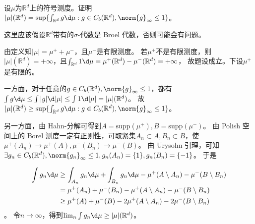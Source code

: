 \documentclass{ctexart}
\newif\ifpreface
\begin{document}
\large
\setlength{\baselineskip}{1.2em}
\ifpreface

\newgeometry{left=2cm,right=2cm,top=2cm,bottom=2cm}
\else
{}
\maketitle
\fi
\begin{problem}\label{pro:1}
  设\(\mu \)为\(\mathbb{R}^d \)上的符号测度。证明\(|\mu|(\mathbb{R}^d) = \sup \{ \int_{\mathbb{R}^d} g \d \mu: g \in C_b(\mathbb{R}^d), \norm{g}_{\infty} \leq 1\} \)。
\end{problem}
\begin{solution}
  这里应该假设\(\mathbb{R}^d \)带有的\(\sigma \)-代数是 Broel 代数，否则可能会有问题。

  由定义知\(|\mu| = \mu^+ + \mu^- \)，且\(\mu^- \)是有限测度。
  若\(\mu^+ \)不是有限测度，则\(|\mu|(\mathbb{R}^d) = + \infty \)，且\(\int_{\mathbb{R}^d} 1 \d \mu = \mu^+(\mathbb{R}^d) - \mu^-(\mathbb{R}^d) = + \infty \)，
  故题设成立。下设\(\mu^+ \)是有限的。

  一方面，对于任意的\(g \in C_b(\mathbb{R}^d), \norm{g}_{\infty} \leq 1 \)，都有\(\int g \d \mu \leq \int |g| \d |\mu| \leq \int 1 \d |\mu| = |\mu|(\mathbb{R}^d) \)。
  故\(|\mu|(\mathbb{R}^d) \geq \sup \{ \int_{\mathbb{R}^d} g \d \mu: g \in C_b(\mathbb{R}^d), \norm{g}_{\infty} \leq 1\} \)。

  另一方面，由 Hahn-分解可得到\(A=\mathrm{supp}(\mu^+),B=\mathrm{supp}(\mu^-) \)。
  由 Polish 空间上的 Borel 测度一定有正则性，可取紧集\(A_n \subset A,B_n \subset B \)，使\(\mu^+(A_n) \to \mu^+(A),\mu^-(B_n) \to \mu^-(B) \)。
  由 Urysohn 引理，可知\(\exists g_n \in C_b(\mathbb{R}^d), \norm{g_n}_{\infty} \leq 1, g_n(A_n) = \{1\}, g_n(B_n) = \{-1\} \)。
  于是

  \begin{equation}\label{equ:2}
    \begin{aligned}
      \int g_n \d \mu &\geq \int_{A_n} g_n \d \mu + \int_{B_n} g_n \d \mu - \mu^+(A \setminus A_n) - \mu^-(B \setminus B_n) \\
      &= \mu^+(A_n) + \mu^-(B_n) - \mu^+(A \setminus A_n) - \mu^-(B \setminus B_n) \\
      &\geq \mu^+ (A) + \mu^-(B) - 2\mu^+(A \setminus A_n) - 2\mu^-(B \setminus B_n)
    \end{aligned}
  \end{equation}
  。
  令\(n \to \infty \)，得到\(\lim_{n}\int g_n \d \mu \geq |\mu|(\mathbb{R}^d)\)。

\end{solution}
\end{document}

